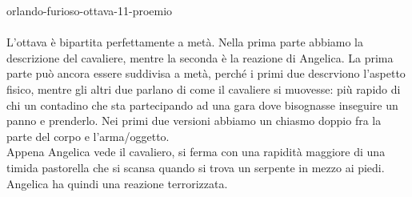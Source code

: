 \documentclass[preview]{standalone}
\begin{document}
\begin{snippet}{orlando-furioso-ottava-11-proemio}
    \\\\
    L'ottava è bipartita perfettamente a metà.
    Nella prima parte abbiamo la descrizione del cavaliere,
    mentre la seconda è la reazione di Angelica.
    La prima parte può ancora essere suddivisa a metà, perché i primi
    due descrviono l'aspetto fisico, mentre gli altri due parlano di 
    come il cavaliere si muovesse: più rapido di
    chi un contadino che sta partecipando ad una gara
    dove bisognasse inseguire un panno e prenderlo.
    Nei primi due versioni abbiamo un chiasmo doppio fra la parte del corpo
    e l'arma/oggetto.
    \\ Appena Angelica vede il cavaliero, si ferma con una rapidità
    maggiore di una timida pastorella che si scansa quando si trova un
    serpente in mezzo ai piedi.
    Angelica ha quindi una reazione terrorizzata.
\end{snippet}
\end{document}
